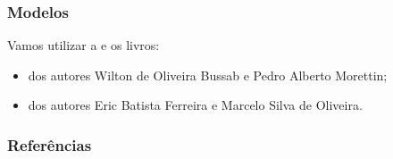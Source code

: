 \documentclass[12pt]{beamer}
\begin{document}
\begin{frame}{}
\frametitle{Modelos}
\begin{block}{}
\justifying
Vamos utilizar a  e os livros:
\begin{itemize}
    \item {} dos autores Wilton de Oliveira Bussab e Pedro Alberto Morettin;
    \item {} dos autores Eric Batista Ferreira e Marcelo Silva de Oliveira.
\end{itemize}
\end{block}
\end{frame}


\begin{frame}[allowframebreaks]
\frametitle{\bf Referências}
\printbibliography
\end{frame}
\end{document}
